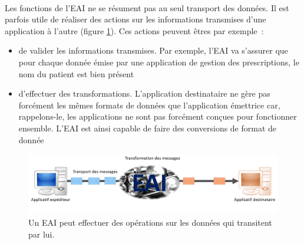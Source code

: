 			\paragraph{}%
			Les fonctions de l'EAI ne se résument pas au seul transport des données. Il
			est parfois utile de réaliser des actions sur les informations transmises
			d'une application à l'autre (figure \ref{interop_transfo}). Ces actions
			peuvent êtres par exemple~:\newline
			\begin{itemize}
			  \item de valider les informations transmises. Par exemple, l'EAI va
			  s'assurer que pour chaque donnée émise par une application de gestion des
			  prescriptions, le nom du patient est bien présent
			  \item d'effectuer des transformations. L'application destinataire ne
			  gère pas forcément les mêmes formats de données que l'application émettrice
			  car, rappelons-le, les applications ne sont pas forcément conçues pour
			  fonctionner ensemble. L'EAI est ainsi capable de faire des conversions de
			  format de donnée\newline
			\end{itemize}
			\begin{figure}[H]
				\centering
				\includegraphics[width=15cm]{../img/eai_2.png}
				\caption{\label{interop_transfo} Un EAI peut effectuer des opérations sur
				les données qui transitent par lui.}
			\end{figure}
			

